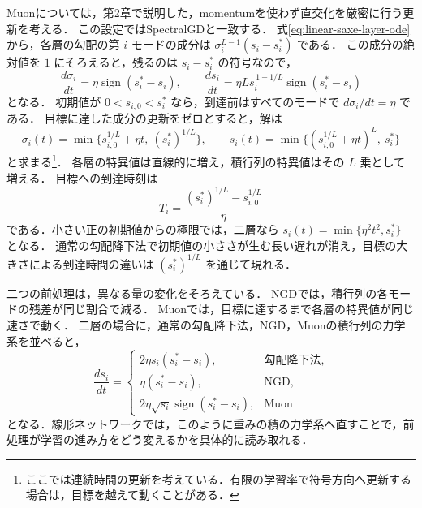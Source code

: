 \documentclass[../main.tex]{subfiles}
\begin{document}
Muonについては，第2章で説明した，momentumを使わず直交化を厳密に行う更新を考える．
この設定ではSpectralGDと一致する．
式\eqref{eq:linear-saxe-layer-ode}から，各層の勾配の第 $i$ モードの成分は
$\sigma_i^{L-1}(s_i-s_i^*)$ である．
この成分の絶対値を $1$ にそろえると，残るのは $s_i-s_i^*$ の符号なので，
\begin{equation}
  \frac{d\sigma_i}{dt}=\eta\operatorname{sign}(s_i^*-s_i),
  \qquad
  \frac{ds_i}{dt}
  =\eta L s_i^{\,1-1/L}\operatorname{sign}(s_i^*-s_i)
  \label{eq:linear-muon-mode-ode}
\end{equation}
となる\cite{vasudeva2026muon}．
初期値が $0<s_{i,0}<s_i^*$ なら，到達前はすべてのモードで $d\sigma_i/dt=\eta$ である．
目標に達した成分の更新をゼロとすると，解は
\begin{equation}
  \sigma_i(t)=\min\{s_{i,0}^{1/L}+\eta t,\ (s_i^*)^{1/L}\},
  \qquad
  s_i(t)=\min\{(s_{i,0}^{1/L}+\eta t)^L,\ s_i^*\}
  \label{eq:linear-muon-mode-solution}
\end{equation}
と求まる\footnote{ここでは連続時間の更新を考えている．有限の学習率で符号方向へ更新する場合は，目標を越えて動くことがある．}．
各層の特異値は直線的に増え，積行列の特異値はその $L$ 乗として増える．
目標への到達時刻は
\begin{equation}
  T_i=\frac{(s_i^*)^{1/L}-s_{i,0}^{1/L}}{\eta}
  \label{eq:linear-muon-mode-time}
\end{equation}
である．小さい正の初期値からの極限では，二層なら $s_i(t)=\min\{\eta^2t^2,s_i^*\}$ となる．
通常の勾配降下法で初期値の小ささが生む長い遅れが消え，目標の大きさによる到達時間の違いは $(s_i^*)^{1/L}$ を通じて現れる．

二つの前処理は，異なる量の変化をそろえている．
NGDでは，積行列の各モードの残差が同じ割合で減る．
Muonでは，目標に達するまで各層の特異値が同じ速さで動く．
二層の場合に，通常の勾配降下法，NGD，Muonの積行列の力学系を並べると，
\begin{equation}
  \frac{ds_i}{dt}
  =\begin{cases}
    2\eta s_i(s_i^*-s_i), & \text{勾配降下法},\\
    \eta(s_i^*-s_i), & \text{NGD},\\
    2\eta\sqrt{s_i}\operatorname{sign}(s_i^*-s_i), & \text{Muon}
  \end{cases}
  \label{eq:linear-mode-comparison}
\end{equation}
となる．線形ネットワークでは，このように重みの積の力学系へ直すことで，前処理が学習の進み方をどう変えるかを具体的に読み取れる．

\chapterbibliography
\end{document}

